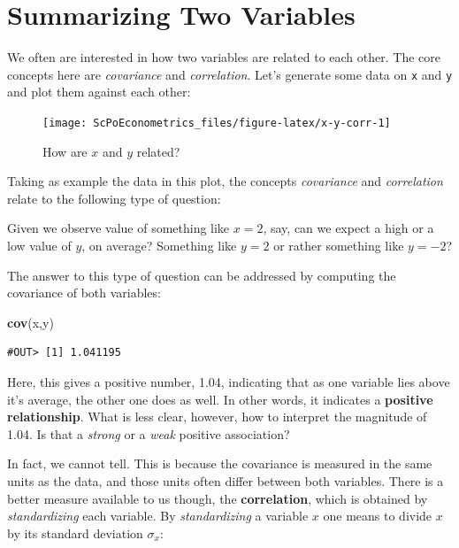 \documentclass[]{book}
\newenvironment{Shaded}{\begin{snugshade}}{\end{snugshade}}
\newcommand{\KeywordTok}[1]{\textcolor[rgb]{0.13,0.29,0.53}{\textbf{#1}}}
\newcommand{\NormalTok}[1]{#1}
\newenvironment{note}{\begin{tcolorbox}[colback=blue!5!white,colframe=blue!75!black,title=\textbf{Note:}]}{\end{tcolorbox}}
\theoremstyle{definition}
\theoremstyle{definition}
\theoremstyle{definition}
\theoremstyle{remark}
\begin{document}
\section{Summarizing Two Variables}\label{summarize-two}

We often are interested in how two variables are related to each other.
The core concepts here are \emph{covariance} and \emph{correlation}.
Let's generate some data on \texttt{x} and \texttt{y} and plot them
against each other:

\begin{figure}

{\centering \texttt{[image: ScPoEconometrics\_files/figure-latex/x-y-corr-1]} 

}

\caption{How are $x$ and $y$ related?}\label{fig:x-y-corr}
\end{figure}

Taking as example the data in this plot, the concepts \emph{covariance}
and \emph{correlation} relate to the following type of question:

\begin{note}
Given we observe value of something like \(x=2\), say, can we expect a
high or a low value of \(y\), on average? Something like \(y=2\) or
rather something like \(y=-2\)?
\end{note}

 The answer to this type of question can be addressed by computing the
covariance of both variables:

\begin{Shaded}
\begin{Highlighting}[]
\KeywordTok{cov}\NormalTok{(x,y)  }
\end{Highlighting}
\end{Shaded}

\begin{verbatim}
#OUT> [1] 1.041195
\end{verbatim}

Here, this gives a positive number, 1.04, indicating that as one
variable lies above it's average, the other one does as well. In other
words, it indicates a \textbf{positive relationship}. What is less
clear, however, how to interpret the magnitude of 1.04. Is that a
\emph{strong} or a \emph{weak} positive association?

In fact, we cannot tell. This is because the covariance is measured in
the same units as the data, and those units often differ between both
variables. There is a better measure available to us though, the
\textbf{correlation}, which is obtained by \emph{standardizing} each
variable. By \emph{standardizing} a variable \(x\) one means to divide
\(x\) by its standard deviation \(\sigma_x\):
\end{document}
